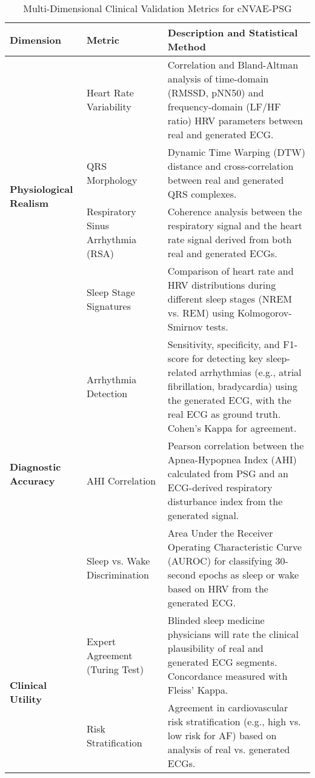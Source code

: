 \documentclass[11pt,en]{elegantpaper}
\begin{document}
\begin{table}[H]
    \centering
    \caption{Multi-Dimensional Clinical Validation Metrics for cNVAE-PSG}
    \label{tab:validation_metrics}
    \begin{tabular}{p{} p{} p{}}
        \toprule
        \textbf{Dimension} & \textbf{Metric} & \textbf{Description and Statistical Method} \\
        \midrule
        \multirow{4}{*}{\textbf{Physiological Realism}} 
        & Heart Rate Variability & Correlation and Bland-Altman analysis of time-domain (RMSSD, pNN50) and frequency-domain (LF/HF ratio) HRV parameters between real and generated ECG. \\
        \cline{2-3}
        & QRS Morphology & Dynamic Time Warping (DTW) distance and cross-correlation between real and generated QRS complexes. \\
        \cline{2-3}
        & Respiratory Sinus Arrhythmia (RSA) & Coherence analysis between the respiratory signal and the heart rate signal derived from both real and generated ECGs. \\
        \cline{2-3}
        & Sleep Stage Signatures & Comparison of heart rate and HRV distributions during different sleep stages (NREM vs. REM) using Kolmogorov-Smirnov tests. \\
        \midrule
        \multirow{3}{*}{\textbf{Diagnostic Accuracy}}
        & Arrhythmia Detection & Sensitivity, specificity, and F1-score for detecting key sleep-related arrhythmias (e.g., atrial fibrillation, bradycardia) using the generated ECG, with the real ECG as ground truth. Cohen's Kappa for agreement. \\
        \cline{2-3}
        & AHI Correlation & Pearson correlation between the Apnea-Hypopnea Index (AHI) calculated from PSG and an ECG-derived respiratory disturbance index from the generated signal. \\
        \cline{2-3}
        & Sleep vs. Wake Discrimination & Area Under the Receiver Operating Characteristic Curve (AUROC) for classifying 30-second epochs as sleep or wake based on HRV from the generated ECG. \\
        \midrule
        \multirow{2}{*}{\textbf{Clinical Utility}}
        & Expert Agreement (Turing Test) & Blinded sleep medicine physicians will rate the clinical plausibility of real and generated ECG segments. Concordance measured with Fleiss' Kappa. \\
        \cline{2-3}
        & Risk Stratification & Agreement in cardiovascular risk stratification (e.g., high vs. low risk for AF) based on analysis of real vs. generated ECGs. \\
        \bottomrule
    \end{tabular}
\end{table}
\end{document}

